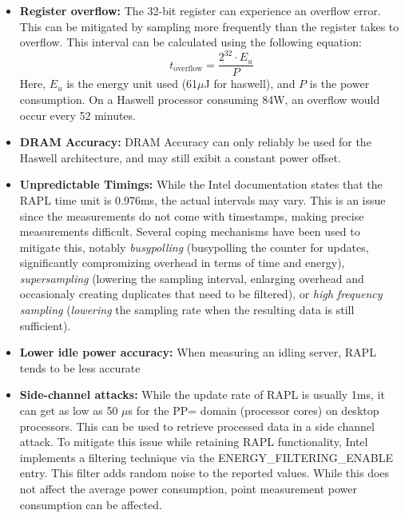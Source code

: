 \begin{itemize}
    \item \textbf{Register overflow: }The 32-bit register can experience an overflow error\parencite{khan2018rapl}. This can be mitigated by sampling more frequently than the register takes to overflow. This interval can be calculated using the following equation: 
    \begin{equation}
        t_{\text{overflow}} = \frac{2^{32} \cdot E_u}{P}
    \end{equation}
    Here, $E_u$ is the energy unit used (61$\mu$J for haswell), and $P$ is the power consumption. On a Haswell processor consuming 84W, an overflow would occur every 52 minutes.
    \item \textbf{DRAM Accuracy: }DRAM Accuracy can only reliably be used for the Haswell architecture\parencite{desrochers2016validation, khan2018rapl}, and may still exibit a constant power offset.
    \item \textbf{Unpredictable Timings: }While the Intel documentation states that the RAPL time unit is 0.976ms, the actual intervals may vary. This is an issue since the measurements do not come with timestamps, making precise measurements difficult\parencite{khan2018rapl}. Several coping mechanisms have been used to mitigate this, notably \textit{busypolling} (busypolling the counter for updates, significantly compromizing overhead in terms of time and energy\parencite{hahnel2012measuring}), \textit{supersampling} (lowering the sampling interval, enlarging overhead and occasionaly creating duplicates that need to be filtered\parencite{khan2018rapl}), or \textit{high frequency sampling} (\textit{lowering} the sampling rate when the resulting data is still sufficient\parencite{servat2016detailed}).
    \item \textbf{Lower idle power accuracy: } When measuring an idling server, RAPL tends to be less accurate\parencite{schone2024energy, desrochers2016validation}
    \item \textbf{Side-channel attacks: } While the update rate of RAPL is usually 1ms, it can get as low as 50 $\mu$s for the PP= domain (processor cores) on desktop processors. This can be used to retrieve processed data in a side channel attack\parencite{lipp2021platypus, schone2024energy}. To mitigate this issue while retaining RAPL functionality, Intel implements a filtering technique via the ENERGY_FILTERING_ENABLE\parencite{intel2023, Table 2-2} entry. This filter adds random noise to the reported values. While this does not affect the average power consumption, point measurement power consumption can be affected.
\end{itemize}


